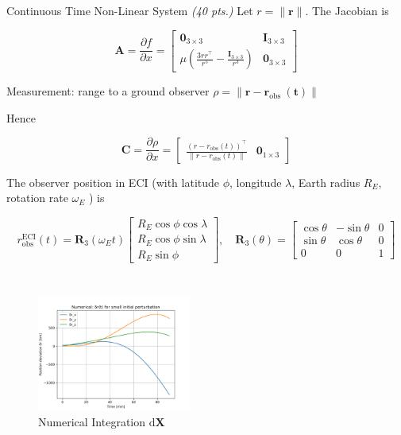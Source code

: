 \begin{hwkProblem}{3}{Continuous Time Non-Linear System \textit{(40 pts.)}}
	Let \(r=\|\boldsymbol{r}\|\). The Jacobian is

	\[
		\mathbf{A}=\frac{\partial f}{\partial x}=\left[\begin{array}{cc}
				\mathbf{0}_{3 \times 3} & \mathbf{I}_{3 \times 3} \\
				\mu\left(\frac{3 r r^{\top}}{r^5}-\frac{\mathbf{I}_{3 \times 3}}{r^3}\right) & \mathbf{0}_{3 \times 3}
		\end{array}\right]
	\]

	Measurement: range to a ground observer \(\rho=\left\|\boldsymbol{r}-\boldsymbol{r}_{\text {obs }}(\boldsymbol{t})\right\|\)

	Hence

	\[
		\mathbf{C}=\frac{\partial \rho}{\partial x}=\left[\begin{array}{ll}
				\frac{\left(r-r_{\text{obs}}(t)\right)^{\top}}{\left\|r-r_{\text{obs}}(t)\right\|} & \mathbf{0}_{1 \times 3}
		\end{array}\right]
	\]

	The observer position in ECI (with latitude \(\phi\), longitude \(\lambda\), Earth radius \(R_E\), rotation rate \(\omega_E\) ) is

	\[
		r_{\text{obs}}^{\mathrm{ECI}}(t)=\mathbf{R}_3\left(\omega_E t\right)\left[\begin{array}{c}
				R_E \cos{\phi} \cos{\lambda}\\
				R_E \cos{\phi} \sin{\lambda}\\
				R_E \sin{\phi}
				\end{array}\right], \quad \mathbf{R}_3(\theta)=\left[\begin{array}{ccc}
				\cos{\theta} & -\sin{\theta} & 0 \\
				\sin{\theta} &  \cos{\theta} & 0 \\
				0 & 0 & 1
		\end{array}\right]
	\]

	\hwkPart{} \label{hwk:s03b}

	\inputminted{python}{./outputs/text/s03b.txt}

	\hwkPart{} \label{hwk:s03c}

	\inputminted{python}{./outputs/text/s03c.txt}

	\pagebreak

	\hwkPart{} \label{hwk:s03d}

	\begin{figure}[H] \label{fig:s03d}
		\begin{center}
			\includegraphics[width=0.45\textwidth]{./outputs/figures/s03d.png}
		\end{center}
		\caption{Numerical Integration \( \mathrm{d}\bm{X} \)}
	\end{figure}


\end{hwkProblem}
